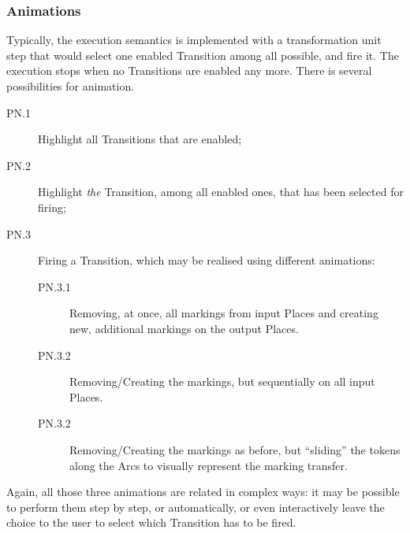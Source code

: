 \subsubsection{Animations}
\label{sec:Examples:PN:Animations}

Typically, the execution semantics is implemented with a transformation unit 
\textsf{step} that would select one enabled \textsf{Transition} among all possible,
and \textsf{fire} it. The execution stops when no \textsf{Transition}s are enabled
any more. There is several possibilities for animation.

\begin{description}
   \item[PN.1] Highlight all \textsf{Transition}s that are enabled;
   \item[PN.2] Highlight \emph{the} \textsf{Transition}, among all enabled ones,
   that has been selected for firing;
   \item[PN.3] Firing a \textsf{Transition}, which may be realised using 
   different animations:
   \begin{description}
      \item[PN.3.1] Removing, at once, all markings from input \textsf{Place}s 
      and creating new, additional markings on the output \textsf{Place}s.
      \item[PN.3.2] Removing/Creating the markings, but sequentially on all input
      \textsf{Place}s.
      \item[PN.3.2] Removing/Creating the markings as before, but ``sliding'' the
      tokens along the \textsf{Arc}s to visually represent the marking transfer.
   \end{description}
\end{description}
Again, all those three animations are related in complex ways: it may be possible
to perform them step by step, or automatically, or even interactively leave the 
choice to the user to select which \textsf{Transition} has to be fired. 